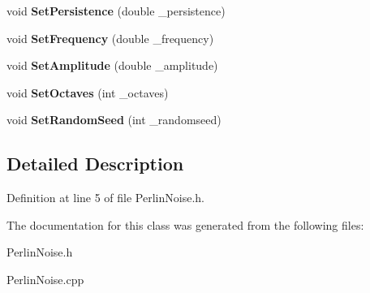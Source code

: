 \begin{DoxyCompactItemize}
\item 
void {\bfseries Set\+Persistence} (double \+\_\+persistence)\hypertarget{classPerlinNoise_a6fc4a8c6d9be6b7139dfc5d9771321f5}{}\label{classPerlinNoise_a6fc4a8c6d9be6b7139dfc5d9771321f5}

\item 
void {\bfseries Set\+Frequency} (double \+\_\+frequency)\hypertarget{classPerlinNoise_adac1a028e0c19d621577ca4f2102820b}{}\label{classPerlinNoise_adac1a028e0c19d621577ca4f2102820b}

\item 
void {\bfseries Set\+Amplitude} (double \+\_\+amplitude)\hypertarget{classPerlinNoise_adfe9927f5f81906d06224289b428baf5}{}\label{classPerlinNoise_adfe9927f5f81906d06224289b428baf5}

\item 
void {\bfseries Set\+Octaves} (int \+\_\+octaves)\hypertarget{classPerlinNoise_ad4a4d35a9758079460dd2091dca03266}{}\label{classPerlinNoise_ad4a4d35a9758079460dd2091dca03266}

\item 
void {\bfseries Set\+Random\+Seed} (int \+\_\+randomseed)\hypertarget{classPerlinNoise_ae1d46c5446cb8f8226c83513c895245c}{}\label{classPerlinNoise_ae1d46c5446cb8f8226c83513c895245c}

\end{DoxyCompactItemize}


\subsection{Detailed Description}


Definition at line 5 of file Perlin\+Noise.\+h.



The documentation for this class was generated from the following files\+:\begin{DoxyCompactItemize}
\item 
Perlin\+Noise.\+h\item 
Perlin\+Noise.\+cpp\end{DoxyCompactItemize}
